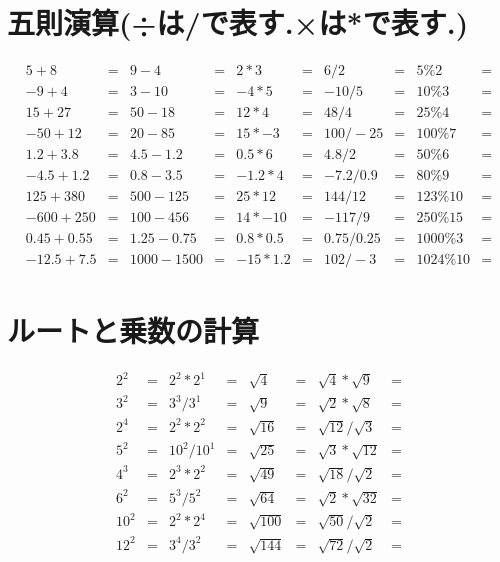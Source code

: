 \documentclass[paper=b4j,landscape,twocolumn,fleqn]{jlreq}
\begin{document}
\section{五則演算(÷は/で表す.×は*で表す.)}
\begin{align*}
    5+8 &= & 9-4 &= & 2*3 &= & 6/2 &= & 5\%2 &= \\
    -9+4 &= & 3-10 &= & -4*5 &= & -10/5 &= & 10\%3 &= \\
    15+27 &= & 50-18 &= & 12*4 &= & 48/4 &= & 25\%4 &= \\
    -50+12 &= & 20-85 &= & 15*-3 &= & 100/-25 &= & 100\%7 &= \\
    1.2+3.8 &= & 4.5-1.2 &= & 0.5*6 &= & 4.8/2 &= & 50\%6 &= \\
    -4.5+1.2 &= & 0.8-3.5 &= & -1.2*4 &= & -7.2/0.9 &= & 80\%9 &= \\
    125+380 &= & 500-125 &= & 25*12 &= & 144/12 &= & 123\%10 &= \\
    -600+250 &= & 100-456 &= & 14*-10 &= & -117/9 &= & 250\%15 &= \\
    0.45+0.55 &= & 1.25-0.75 &= & 0.8*0.5 &= & 0.75/0.25 &= & 1000\%3 &= \\
    -12.5+7.5 &= & 1000-1500 &= & -15*1.2 &= & 102/-3 &= & 1024\%10 &= 
\end{align*}
\section{ルートと乗数の計算}
\begin{align*}
    2^2 &= & 2^2 * 2^1 &= & \sqrt{4} &= & \sqrt{4} * \sqrt{9} &= \\
    3^2 &= & 3^3 / 3^1 &= & \sqrt{9} &= & \sqrt{2} * \sqrt{8} &= \\
    2^4 &= & 2^2 * 2^2 &= & \sqrt{16} &= & \sqrt{12} / \sqrt{3} &= \\
    5^2 &= & 10^2 / 10^1 &= & \sqrt{25} &= & \sqrt{3} * \sqrt{12} &= \\
    4^3 &= & 2^3 * 2^2 &= & \sqrt{49} &= & \sqrt{18} / \sqrt{2} &= \\
    6^2 &= & 5^3 / 5^2 &= & \sqrt{64} &= & \sqrt{2} * \sqrt{32} &= \\
    10^2 &= & 2^2 * 2^4 &= & \sqrt{100} &= & \sqrt{50} / \sqrt{2} &= \\
    12^2 &= & 3^4 / 3^2 &= & \sqrt{144} &= & \sqrt{72} / \sqrt{2} &= 
\end{align*}
\end{document}
